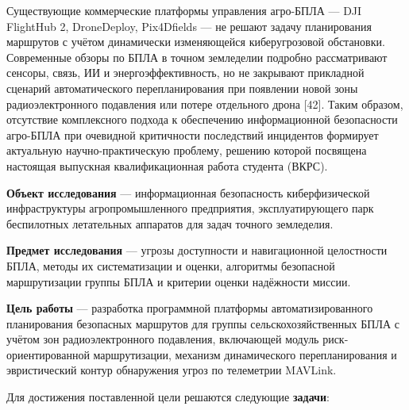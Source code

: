 Существующие коммерческие платформы управления агро-БПЛА --- DJI FlightHub 2, DroneDeploy, Pix4Dfields --- не решают задачу планирования маршрутов с учётом динамически изменяющейся киберугрозовой обстановки. Современные обзоры по БПЛА в точном земледелии подробно рассматривают сенсоры, связь, ИИ и энергоэффективность, но не закрывают прикладной сценарий автоматического перепланирования при появлении новой зоны радиоэлектронного подавления или потере отдельного дрона {[}42{]}. Таким образом, отсутствие комплексного подхода к обеспечению информационной безопасности агро-БПЛА при очевидной критичности последствий инцидентов формирует актуальную научно-практическую проблему, решению которой посвящена настоящая выпускная квалификационная работа студента (ВКРС).

\textbf{Объект исследования} --- информационная безопасность киберфизической инфраструктуры агропромышленного предприятия, эксплуатирующего парк беспилотных летательных аппаратов для задач точного земледелия.

\textbf{Предмет исследования} --- угрозы доступности и навигационной целостности БПЛА, методы их систематизации и оценки, алгоритмы безопасной маршрутизации группы БПЛА и критерии оценки надёжности миссии.

\textbf{Цель работы} --- разработка программной платформы автоматизированного планирования безопасных маршрутов для группы сельскохозяйственных БПЛА с учётом зон радиоэлектронного подавления, включающей модуль риск-ориентированной маршрутизации, механизм динамического перепланирования и эвристический контур обнаружения угроз по телеметрии MAVLink.

Для достижения поставленной цели решаются следующие \textbf{задачи}:

